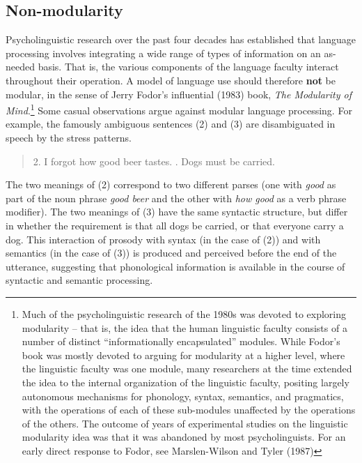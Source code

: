 \documentclass[a4paper]{article}
\begin{document}
\subsection{Non-modularity}

Psycholinguistic research over the past four decades has established that language processing involves integrating a wide range of types of information on an as-needed basis.  That is, the various components of the language faculty interact throughout their operation.  A model of language use should therefore {\bf not} be modular, in the sense of Jerry Fodor's influential (1983) book, {\it The Modularity of Mind}.\footnote {Much of the psycholinguistic research of the 1980s was devoted to exploring modularity -- that is, the idea that the human linguistic faculty consists of a number of distinct ``informationally encapsulated'' modules.  While Fodor's book was mostly devoted to arguing for modularity at a higher level, where the linguistic faculty was one module, many researchers at the time extended the idea to the internal organization of the linguistic faculty, positing largely autonomous mechanisms for phonology, syntax, semantics, and pragmatics, with the operations of each of these sub-modules unaffected by the operations of the others. The outcome of years of experimental studies on the linguistic modularity idea was that it was abandoned by most psycholinguists. For an early direct response to Fodor, see Marslen-Wilson and Tyler (1987)}
\newline
\newline
Some casual observations argue against modular language processing.  For example, the famously ambiguous sentences (2) and (3) are disambiguated in speech by the stress patterns.
\begin{quote}
2. I forgot how good beer tastes.
. Dogs must be carried.
\end{quote}
The two meanings of (2) correspond to two different parses (one with {\it good} as part of the noun phrase {\it good beer} and the other with {\it how good} as a verb phrase modifier).  The two meanings of (3) have the same syntactic structure, but differ in whether the requirement is that all dogs be carried, or that everyone carry a dog.  This interaction of prosody with syntax (in the case of (2)) and with semantics (in the case of (3)) is produced and perceived before the end of the utterance, suggesting that phonological information is available in the course of syntactic and semantic processing.  
\newline
\end{document}

